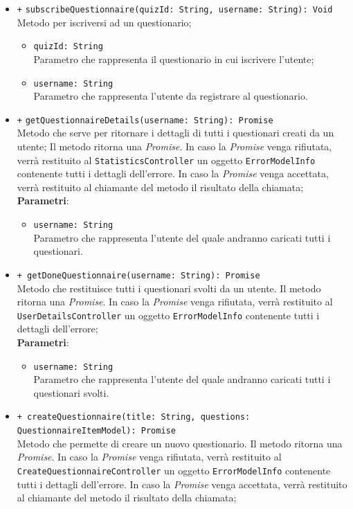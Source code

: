 \begin{itemize}
\begin{itemize}
\begin{itemize}
	\end{itemize}
	\item \texttt{+} \texttt{subscribeQuestionnaire(quizId: String, username: String): Void} \\Metodo per iscriversi ad un questionario;
	\begin{itemize}
		\item \texttt{quizId: String} \\ Parametro che rappresenta il questionario in cui iscrivere l'utente;
		\item \texttt{username: String} \\ Parametro che rappresenta l'utente da registrare al questionario.
	\end{itemize}
	\item \texttt{+} \texttt{getQuestionnaireDetails(username: String): Promise} \\Metodo che serve per ritornare i dettagli di tutti i questionari creati da un utente; Il metodo ritorna una \textit{Promise}. In caso la \textit{Promise} venga rifiutata, verrà restituito al \texttt{StatisticsController} un oggetto \texttt{ErrorModelInfo} contenente tutti i dettagli dell'errore. In caso la \textit{Promise} venga accettata, verrà restituito al chiamante del metodo il risultato della chiamata;\\ 
     \textbf{Parametri}:
	\begin{itemize}
		\item \texttt{username: String} \\ Parametro che rappresenta l'utente del quale andranno caricati tutti i questionari.
	\end{itemize}
	\item \texttt{+ getDoneQuestionnaire(username: String): Promise} \\ Metodo che restituisce tutti i questionari svolti da un utente. Il metodo ritorna una \textit{Promise}. In caso la \textit{Promise} venga rifiutata, verrà restituito al \\ \texttt{UserDetailsController} un oggetto \texttt{ErrorModelInfo} contenente tutti i dettagli dell'errore; \\
	\textbf{Parametri}: 
	\begin{itemize}
		\item \texttt{username: String} \\ Parametro che rappresenta l'utente del quale andranno caricati tutti i questionari svolti.
	\end{itemize}
	\item \texttt{+ createQuestionnaire(title: String, questions: QuestionnaireItemModel): Promise} \\ Metodo che permette di creare un nuovo questionario. Il metodo ritorna una \textit{Promise}. In caso la \textit{Promise} venga rifiutata, verrà restituito al \\ \texttt{CreateQuestionnaireController} un oggetto \texttt{ErrorModelInfo} contenente tutti i dettagli dell'errore. In caso la \textit{Promise} venga accettata, verrà restituito al chiamante del metodo il risultato della chiamata;\\

\end{itemize}
\end{itemize}
